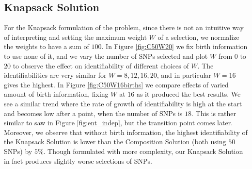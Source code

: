 \documentclass[14pt, oneside]{article}   	%
\begin{document}
\subsection{Knapsack Solution}
For the Knapsack formulation of the problem, since there is not an intuitive way of interpreting and setting the maximum weight $W$ of a selection,
we normalize the weights to have a sum of $100$.
In Figure \ref{fig:C50W20} we fix birth information to use none of it, and we vary the number of SNPs selected
and plot $W$ from $0$ to $20$ to observe the effect on identifiability of different choices of $W$.
The identifiabilities are very similar for $W=8, 12, 16, 20$, and in particular $W=16$ gives the highest.
In Figure \ref{fig:C50W16births} we compare effects of varied amount of birth information, fixing $W$ at $16$ as it produced the best results.
We see a similar trend where the rate of growth of identifiability is high at the start and becomes low after a point, when the number of SNPs is $18$.
This is rather similar to saw in Figure \ref{fig:ent_indep}, but the transition point comes later.
Moreover, we observe that without birth information,
the highest identifiability of the Knapsack Solution is lower than the Composition Solution (both using $50$ SNPs) by $5\%$. 
Though formulated with more complexity, our Knapsack Solution in fact produces slightly worse selections of SNPs.
%
%
%
%
%
\end{document}
